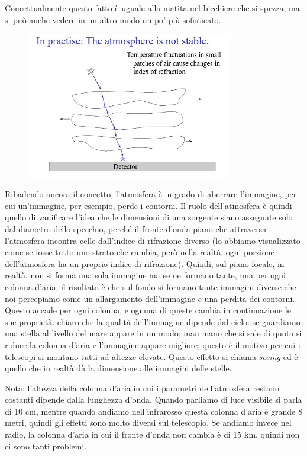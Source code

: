 Concettualmente questo fatto è uguale alla matita nel bicchiere che si spezza, ma si può anche vedere in un altro modo un po' più sofisticato.

\begin{figure}[H]
    \centering
    \includegraphics[width=9cm]{19.jpg}
    \label{}
\end{figure}

Ribadendo ancora il concetto, l'atmosfera è in grado di aberrare l'immagine, per cui un'immagine, per esempio, perde i contorni. Il ruolo dell'atmosfera è quindi quello di vanificare l'idea che le dimensioni di una sorgente siano assegnate solo dal diametro dello specchio, perché il fronte d'onda piano che attraversa l'atmosfera incontra celle dall'indice di rifrazione diverso (lo abbiamo visualizzato come se fosse tutto uno strato che cambia, però nella realtà, ogni porzione dell'atmosfera ha un proprio indice di rifrazione). Quindi, sul piano focale, in realtà, non si forma una sola immagine ma se ne formano tante, una per ogni colonna d'aria; il risultato è che sul fondo si formano tante immagini diverse che noi percepiamo come un allargamento dell'immagine e una perdita dei contorni. Questo accade per ogni colonna, e ognuna di queste cambia in continuazione le sue proprietà. \E chiaro che la qualità dell'immagine dipende dal cielo: se guardiamo una stella al livello del mare appare in un modo; man mano che si sale di quota si riduce la colonna d'aria e l'immagine appare migliore; questo è il motivo per cui i telescopi si montano tutti ad altezze elevate. Questo effetto si chiama \textit{seeing} ed è quello che in realtà dà la dimensione alle immagini delle stelle.

Nota: l'altezza della colonna d'aria in cui i parametri dell'atmosfera restano costanti dipende dalla lunghezza d'onda. Quando parliamo di luce visibile si parla di 10 cm, mentre quando andiamo nell'infrarosso questa colonna d'aria è grande 8 metri, quindi gli effetti sono molto diversi sul telescopio. Se andiamo invece nel radio, la colonna d'aria in cui il fronte d'onda non cambia è di 15 km, quindi non ci sono tanti problemi.

